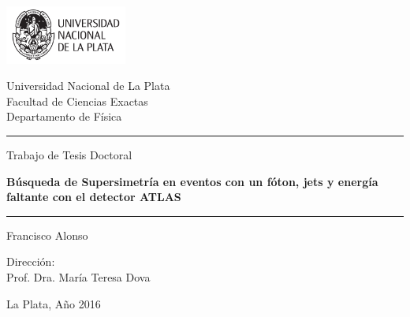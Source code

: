 \newcommand{\HRule}{\rule{\linewidth}{1pt}}

\begin{titlepage}

  \centering

  \includegraphics[width=0.30\textwidth]{figures/logo_unlp.pdf}


  \vspace{0.5cm}

  {
    \large \sc
    Universidad Nacional de La Plata \\[0.25cm]
    Facultad de Ciencias Exactas \\[0.25cm]
    Departamento de Física
  }

  \vspace{1.5cm}



  \HRule

  \vspace{0.2cm}

  {\large Trabajo de Tesis Doctoral}\\[0.5cm]

  \vspace{0.3cm}

  {
    \huge \bfseries Búsqueda de Supersimetría en eventos con un fóton,
    jets y energía faltante con el detector ATLAS\\[0.4cm]
  }

  \vspace{0.2cm}

  \HRule

  \vspace{1.5cm}

  \noindent
  Francisco Alonso

  \vspace{1cm}

  Dirección: \\
  Prof. Dra. María Teresa Dova

  \vfill

  {\large La Plata, Año 2016}

\end{titlepage}
